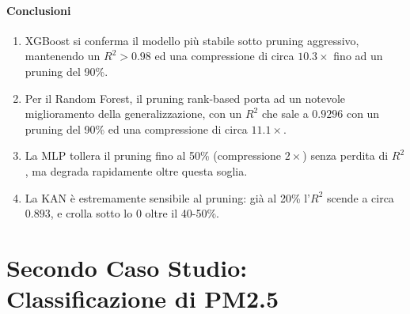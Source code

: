 \documentclass[a4paper,12pt]{report}
\begin{document}
	\subsubsection{Conclusioni}
	\begin{enumerate}
		\item XGBoost si conferma il modello più stabile sotto pruning aggressivo, mantenendo un \(R^2 > 0.98\) ed una compressione di circa $10.3\times$ fino ad un pruning del 90\%.
		\item Per il Random Forest, il pruning rank-based porta ad un notevole miglioramento della generalizzazione, con un \(R^2\) che sale a $0.9296$ con un pruning del 90\% ed una compressione di circa $11.1\times$.
		\item La MLP tollera il pruning fino al 50\% (compressione $2\times$) senza perdita di $R^2$, ma degrada rapidamente oltre questa soglia.
		\item La KAN è estremamente sensibile al pruning: già al 20\% l'$R^2$ scende a circa $0.893$, e crolla sotto lo 0 oltre il 40-50\%.
	\end{enumerate}
	
	\chapter{Secondo Caso Studio: Classificazione di PM2.5}
	
\end{document}
